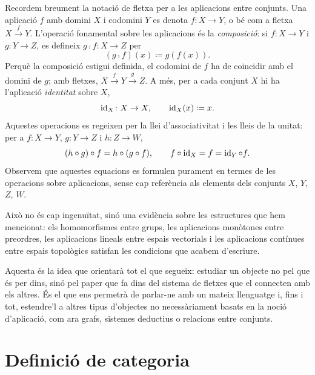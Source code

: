 Recordem breument la notació de fletxa per a les aplicacions entre conjunts. Una aplicació $f$ amb domini $X$ i codomini $Y$ es denota $f\colon X\to Y$, o bé com a fletxa $X\xrightarrow{f}Y$. L'operació fonamental sobre les aplicacions és la \emph{composició}: si $f\colon X\to Y$ i $g\colon Y\to Z$, es defineix $g\comp f\colon X\to Z$ per
\[
(g\comp f)(x)\coloneqq g(f(x)).
\]
Perquè la composició estigui definida, el codomini de $f$ ha de coincidir amb el domini de $g$; amb fletxes, $X\xrightarrow{f}Y\xrightarrow{g}Z$. A més, per a cada conjunt $X$ hi ha l'aplicació \emph{identitat} sobre $X$,
\[
\operatorname{id}_X\colon X\to X,\qquad \operatorname{id}_X(x)\coloneqq x.
\]
Aquestes operacions es regeixen per la llei d'associativitat i les lleis de la unitat: per a $f\colon X\to Y$, $g\colon Y\to Z$ i $h\colon Z\to W$,
\[
(h\circ g)\circ f=h\circ(g\circ f),\qquad f\circ\operatorname{id}_X=f=\operatorname{id}_Y\circ f.
\]
Observem que aquestes equacions es formulen purament en termes de les operacions sobre aplicacions, sense cap referència als elements dels conjunts $X$, $Y$, $Z$, $W$.

Això no és cap ingenuïtat, sinó una evidència sobre les estructures que hem mencionat: els homomorfismes entre grups, les aplicacions monòtones entre preordres, les aplicacions lineals entre espais vectorials i les aplicacions contínues entre espais topològics satisfan les condicions que acabem d'escriure.

Aquesta és la idea que orientarà tot el que segueix: estudiar un objecte no pel que és per dins, sinó pel paper que fa dins del sistema de fletxes que el connecten amb els altres. És el que ens permetrà de parlar-ne amb un mateix llenguatge i, fins i tot, estendre'l a altres tipus d'objectes no necessàriament basats en la noció d'aplicació, com ara grafs, sistemes deductius o relacions entre conjunts.

\section{Definició de categoria}

